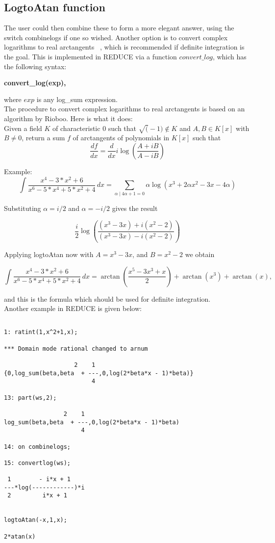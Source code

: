 \subsection{LogtoAtan function}
The user could then combine these to form a more elegant answer, using the switch combinelogs if one so wished. Another option is to convert complex logarithms to real arctangents ~\cite{Bron97}, which is recommended if definite integration is the goal. This is implemented in \small{REDUCE} via a function $convert\_log$, which has the following syntax:
\begin{center} \bf{convert\_log(exp)}, \end{center}
where $exp$ is any log\_sum expression.\\


The procedure to convert complex logarithms to real arctangents is based on an algorithm by Rioboo. Here is what it does: \\

Given a field $K$ of characteristic 0 such that $\sqrt(-1) \not\in K$ and 
$A, B \in K[x]$ with $B \not = 0$, return a sum $f$ of arctangents of polynomials in $K[x]$ such that
\[  \frac{df}{dx}=\frac{d}{dx} i \log(\frac{A+ i B}{A- i B}) \]

Example:
\[ \int \frac{x^4-3*x^2+6}{x^6-5*x^4+5*x^2+4} \, dx = \sum_{ \alpha \mid 4\alpha+1=0} \alpha \log(x^3+2\alpha x^2-3 x-4 \alpha) \]

Substituting $\alpha=i/2$ and $\alpha=-i/2$ gives the result

\[ \frac{i}{2} \log(\frac{(x^3-3 x)+i (x^2-2)}{(x^3-3 x)-i (x^2-2)}) \]

Applying logtoAtan now with $A=x^3-3 x$, and $B=x^2-2$ we obtain

\[ \int \frac{x^4-3*x^2+6}{x^6-5*x^4+5*x^2+4} \, dx = \arctan(\frac{x^5-3 x^3+x}{2})+\arctan(x^3)+\arctan(x) , \]

and this is the formula which should be used for definite integration. \\

Another example in \small{REDUCE} is given below:
\begin{verbatim}

1: ratint(1,x^2+1,x);

*** Domain mode rational changed to arnum

                    2    1
{0,log_sum(beta,beta  + ---,0,log(2*beta*x - 1)*beta)}
                         4

13: part(ws,2);

                 2    1
log_sum(beta,beta  + ---,0,log(2*beta*x - 1)*beta)
                      4

14: on combinelogs;

15: convertlog(ws);

 1        - i*x + 1
---*log(------------)*i 
 2         i*x + 1


logtoAtan(-x,1,x);

2*atan(x) 

\end{verbatim}
